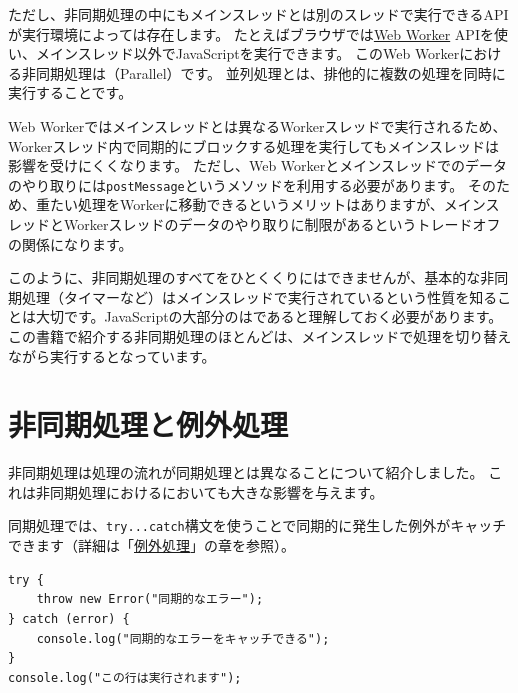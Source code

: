 ただし、非同期処理の中にもメインスレッドとは別のスレッドで実行できるAPIが実行環境によっては存在します。
たとえばブラウザでは\href{https://developer.mozilla.org/ja/docs/Web/API/Web_Workers_API/Using_web_workers}{Web
Worker} APIを使い、メインスレッド以外でJavaScriptを実行できます。
このWeb Workerにおける非同期処理は\textbf{}（Parallel）です。
並列処理とは、排他的に複数の処理を同時に実行することです。

Web Workerではメインスレッドとは異なるWorkerスレッドで実行されるため、Workerスレッド内で同期的にブロックする処理を実行してもメインスレッドは影響を受けにくくなります。
ただし、Web Workerとメインスレッドでのデータのやり取りには\texttt{postMessage}というメソッドを利用する必要があります。
そのため、重たい処理をWorkerに移動できるというメリットはありますが、メインスレッドとWorkerスレッドのデータのやり取りに制限があるというトレードオフの関係になります。

このように、非同期処理のすべてをひとくくりにはできませんが、基本的な非同期処理（タイマーなど）はメインスレッドで実行されているという性質を知ることは大切です。JavaScriptの大部分の\textbf{}は\textbf{}であると理解しておく必要があります。
この書籍で紹介する非同期処理のほとんどは、メインスレッドで処理を切り替えながら実行する\textbf{}となっています。

\hypertarget{async-processing-and-error-handling}{%
\section{非同期処理と例外処理}\label{async-processing-and-error-handling}}

非同期処理は処理の流れが同期処理とは異なることについて紹介しました。
これは非同期処理における\textbf{}においても大きな影響を与えます。

同期処理では、\texttt{try...catch}構文を使うことで同期的に発生した例外がキャッチできます（詳細は「\hyperlink{error-handling}{例外処理}」の章を参照）。

\begin{lstlisting}
try {
    throw new Error("同期的なエラー");
} catch (error) {
    console.log("同期的なエラーをキャッチできる");
}
console.log("この行は実行されます");
\end{lstlisting}

